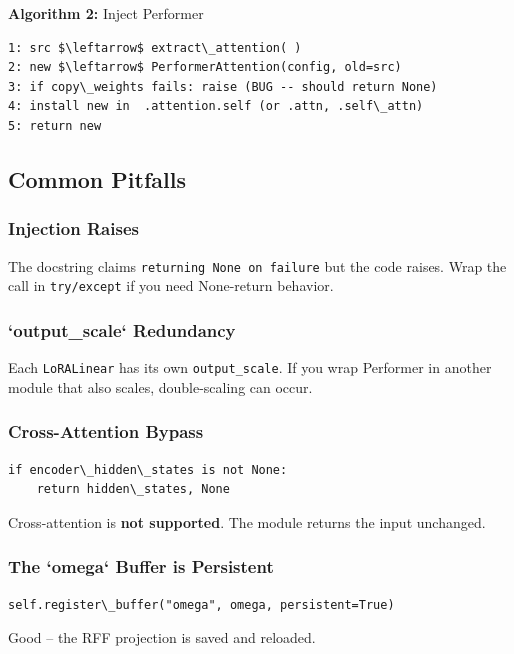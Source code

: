 \textbf{Algorithm 2:} Inject Performer
\begin{lstlisting}
1: src $\leftarrow$ extract\_attention( )
2: new $\leftarrow$ PerformerAttention(config, old=src)
3: if copy\_weights fails: raise (BUG -- should return None)
4: install new in  .attention.self (or .attn, .self\_attn)
5: return new
\end{lstlisting}

\subsection{Common Pitfalls}

\subsubsection{Injection Raises}

The docstring claims \texttt{returning None on failure} but the code raises. 
Wrap the call in \texttt{try/except} if you need None-return behavior.

\subsubsection{`output\_scale` Redundancy}

Each \texttt{LoRALinear} has its own \texttt{output\_scale}. If you wrap Performer in 
another module that also scales, double-scaling can occur.

\subsubsection{Cross-Attention Bypass}

\begin{lstlisting}
if encoder\_hidden\_states is not None:
    return hidden\_states, None
\end{lstlisting}

Cross-attention is \textbf{not supported}. The module returns the input 
unchanged.

\subsubsection{The `omega` Buffer is Persistent}

\begin{lstlisting}
self.register\_buffer("omega", omega, persistent=True)
\end{lstlisting}

Good -- the RFF projection is saved and reloaded.

